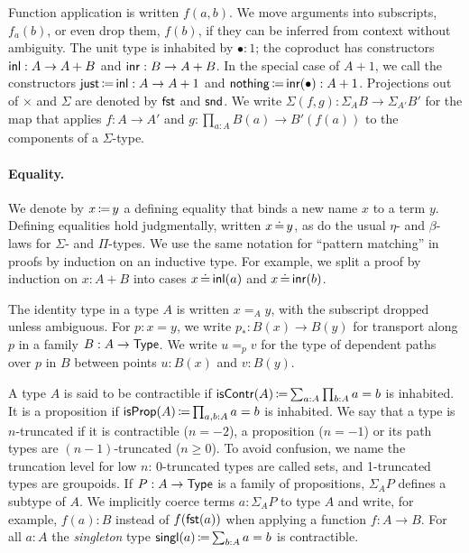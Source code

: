 Function application is written \( f(a, b) \).
We move arguments into subscripts, \( f_a(b) \), or even drop them, \( f(b) \), if they can be inferred from context without ambiguity.
The unit type is inhabited by \( \bullet : 1 \);
the coproduct has constructors \( \operatorname{\mathsf{inl}} : A \to A + B \) and \( \operatorname{\mathsf{inr}} : B \to A + B \).
In the special case of \( A + 1 \), we call the constructors \( \operatorname{\mathsf{just}} \operatorname{\mathrel{\coloneq}} \operatorname{\mathsf{inl}} : A \to A + 1 \) and \( \operatorname{\mathsf{nothing}} \operatorname{\mathrel{\coloneq}} \operatorname{\mathsf{inr}}(\bullet) : A + 1 \).
Projections out of \( \times \) and \( \Sigma \) are denoted by \( \mathsf{fst} \) and \( \mathsf{snd} \).
We write \( \Sigma(f, g) : \Sigma_A B \to \Sigma_{A'} B' \) for the map that applies
\( f : A \to A' \) and \( g : \prod_{a : A} B(a) \to B'(f(a)) \) to the components of a \( \Sigma \)-type.

\paragraph{Equality.}
We denote by \( x \operatorname{\mathrel{\coloneq}} y \) a defining equality that binds a new name \( x \) to a term \( y \).
Defining equalities hold judgmentally, written \( x \operatorname{\mathrel{\doteq}} y \), as do the usual \( \eta \)- and \( \beta \)-laws for \( \Sigma \)- and \( \Pi \)-types.
We use the same notation for \enquote{pattern matching} in proofs by induction on an inductive type.
For example, we split a proof by induction on \( x : A + B \) into cases \( x \operatorname{\mathrel{\doteq}} \operatorname{\mathsf{inl}}(a) \) and \( x \operatorname{\mathrel{\doteq}} \operatorname{\mathsf{inr}}(b) \).

The identity type in a type \( A \) is written \( x =_A y \), with the subscript dropped unless ambiguous.
For \( p : x = y \), we write \( p_* : B(x) \to B(y) \) for transport along \( p \) in a family \( B : A \to \operatorname{\mathsf{Type}} \).
We write \( u =_p v \) for the type of dependent paths over \( p \) in \( B \) between points \( u : B(x) \) and \( v : B(y) \).

A type \( A \) is said to be contractible if \( \mathsf{isContr}(A) \operatorname{\mathrel{\coloneq}} \sum_{a : A} \prod_{b : A} a = b \) is inhabited.
It is a proposition if \( \mathsf{isProp}(A) \operatorname{\mathrel{\coloneq}} \prod_{a, b : A} a = b \) is inhabited.
We say that a type is \( n \)-truncated if it is contractible (\( n = -2 \)), a proposition (\( n = -1 \))
or its path types are \( (n-1) \)-truncated (\( n \geq 0 \)).
To avoid confusion, we name the truncation level for low \( n \):
0-truncated types are called sets, and 1-truncated types are groupoids.
If \( P : A \to \operatorname{\mathsf{Type}} \) is a family of propositions, \( \Sigma_A P \) defines a subtype of \( A \).
We implicitly coerce terms \( a : \Sigma_A P \) to type \( A \) and write, for example,
\( f(a) : B \) instead of \( f(\mathsf{fst}(a)) \) when applying a function \( f : A \to B \).
For all \( a : A \) the \emph{singleton} type \( \operatorname{\mathsf{singl}}(a) \operatorname{\mathrel{\coloneq}} \sum_{b : A} a = b \) is contractible.

